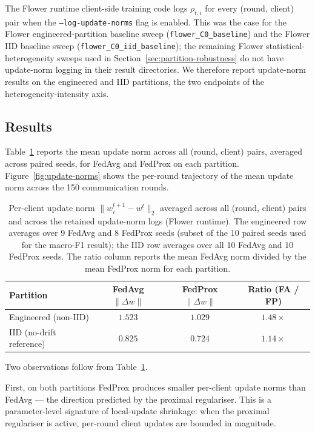 \documentclass[11pt,a4paper]{report}
\begin{document}
The Flower runtime client-side training code logs $\rho_{t,i}$
for every (round, client) pair when the
\texttt{--log-update-norms} flag is enabled. This was the case
for the Flower engineered-partition baseline sweep
(\texttt{flower\_C0\_baseline}) and the Flower IID baseline
sweep (\texttt{flower\_C0\_iid\_baseline}); the remaining
Flower statistical-heterogeneity sweeps used in
Section~\ref{sec:partition-robustness} do not have update-norm
logging in their result directories. We therefore report
update-norm results on the engineered and IID partitions, the
two endpoints of the heterogeneity-intensity axis.

\subsection{Results}
\label{sec:update-norms-results}

Table~\ref{tab:update-norms} reports the mean update norm
across all (round, client) pairs, averaged across paired seeds,
for FedAvg and FedProx on each partition.
Figure~\ref{fig:update-norms} shows the per-round trajectory of
the mean update norm across the 150 communication rounds.

\begin{table}[!htbp]
\centering
\caption{Per-client update norm
$\lVert w_i^{t+1} - w^t \rVert_2$ averaged across all (round,
client) pairs and across the retained update-norm logs (Flower
runtime). The engineered row averages over 9 FedAvg and 8 FedProx
seeds (subset of the 10 paired seeds used for the macro-F1 result);
the IID row averages over all 10 FedAvg and 10 FedProx seeds. The
ratio column reports the mean FedAvg norm divided by the mean
FedProx norm for each partition.}
\label{tab:update-norms}
\small
\begin{tabular}{lccc}
\toprule
Partition & FedAvg $\lVert \Delta w \rVert$ & FedProx $\lVert \Delta w \rVert$ & Ratio (FA / FP) \\
\midrule
Engineered (non-IID)   & $1.523$ & $\mathbf{1.029}$ & $\mathbf{1.48\times}$ \\
IID (no-drift reference) & $0.825$ & $\mathbf{0.724}$ & $1.14\times$ \\
\bottomrule
\end{tabular}
\end{table}

Two observations follow from Table~\ref{tab:update-norms}.

First, on both partitions FedProx produces smaller per-client
update norms than FedAvg --- the direction predicted by the
proximal regulariser. This is a parameter-level signature of
local-update shrinkage: when the proximal regulariser is
active, per-round client updates are bounded in magnitude.
\end{document}
